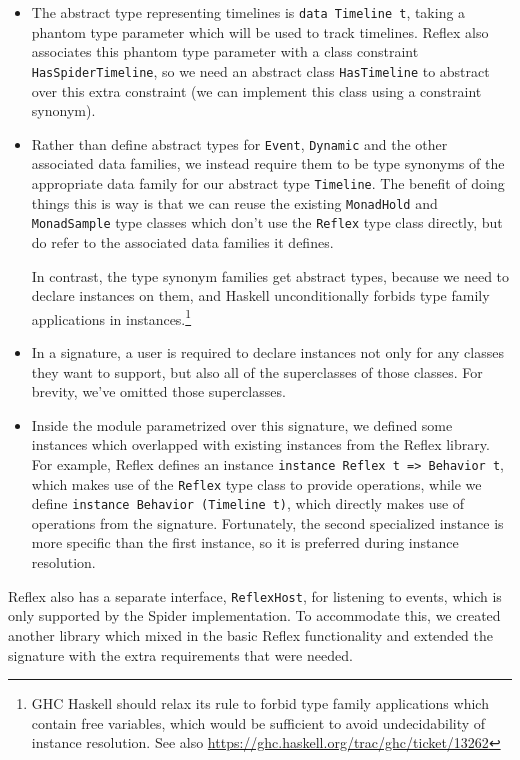 \begin{itemize}
    \item The abstract type representing timelines is
        \verb|data Timeline t|, taking a phantom type parameter
        which will be used to track timelines.
        Reflex also associates this phantom type parameter with
        a class constraint \verb|HasSpiderTimeline|, so we need
        an abstract class \verb|HasTimeline| to abstract over
        this extra constraint (we can implement this class using
        a constraint synonym).

    \item Rather than define abstract types for \verb|Event|,
        \verb|Dynamic| and the other associated data families,
        we instead require them to be type synonyms of the
        appropriate data family for our abstract type \verb|Timeline|.
        The benefit of doing things this is way is that we can
        reuse the existing \verb|MonadHold| and \verb|MonadSample|
        type classes which don't use the \verb|Reflex|
        type class directly, but do refer to the associated
        data families it defines.

        In contrast, the type synonym families get abstract
        types, because we need to declare instances on them,
        and Haskell unconditionally forbids type family applications in
        instances.\footnote{GHC Haskell should relax its rule
        to forbid type family applications which contain free
        variables, which would be sufficient to avoid undecidability
        of instance resolution.  See also
        \url{https://ghc.haskell.org/trac/ghc/ticket/13262}}

    \item In a signature, a user is required to declare
        instances not only for any classes they want to support,
        but also all of the superclasses of those classes.  For
        brevity, we've
        omitted those superclasses.

    \item Inside the module parametrized over this signature,
        we defined some instances which overlapped with existing
        instances from the Reflex library.  For example, Reflex
        defines an instance \verb|instance Reflex t => Behavior t|,
        which makes use of the \verb|Reflex| type class to provide
        operations,
        while we define \verb|instance Behavior (Timeline t)|, which
        directly makes use of operations from the signature.
        Fortunately, the second specialized instance is more specific
        than the first instance, so it is preferred during instance
        resolution.
\end{itemize}
%
Reflex also has a separate interface, \verb|ReflexHost|, for listening
to events, which is only supported by the Spider implementation.
To accommodate this, we created another library which mixed in
the basic Reflex functionality and extended the signature with the
extra requirements that were needed.

